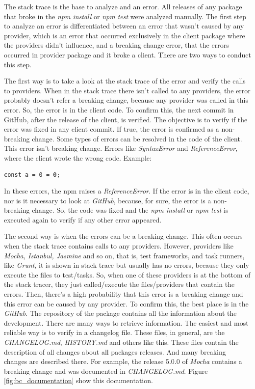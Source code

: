 The stack trace is the base to analyze and an error.
All releases of any package that broke in the \textit{npm install} or \textit{npm test} were analyzed manually. The first step to analyze an error is differentiated between an error that wasn't caused by any provider, which is an error that occurred exclusively in the client package where the providers didn’t influence, and a breaking change error, that the errors occurred in provider package and it broke a client. There are two ways to conduct this step.

The first way is to take a look at the stack trace of the error and verify the calls to providers. When in the stack trace there isn't called to any providers, the error probably doesn’t refer a breaking change, because any provider was called in this error. So, the error is in the client code. To confirm this, the next commit in GitHub, after the release of the client, is verified. The objective is to verify if the error was fixed in any client commit. If true, the error is confirmed as a non-breaking change.
Some types of errors can be resolved in the code of the client. This error isn’t breaking change. Errors like \textit{SyntaxError} and \textit{ReferenceError}, where the client wrote the wrong code. Example:

\begin{lstlisting}[style=Javascript, label=cod:syntax:error, caption={Reference Error code in JavaScript}]
const a = 0 = 0;
\end{lstlisting}

In these errors, the npm raises a \textit{ReferenceError}. If the error is in the client code, nor is it necessary to look at \textit{GitHub}, because, for sure, the error is a non-breaking change. So, the code was fixed and the \textit{npm install} or \textit{npm test} is executed again to verify if any other error appeared.

The second way is when the errors can be a breaking change. This often occurs when the stack trace contains calls to any providers. However, providers like \textit{Mocha, Istanbul, Jasmine} and so on, that is, test frameworks, and task runners, like \textit{Grunt}, it is shown in stack trace but usually has no errors, because they only execute the files to test/tasks. So, when one of these providers is at the bottom of the stack tracer, they just called/execute the files/providers that contain the errors. Then, there’s a high probability that this error is a breaking change and this error can be caused by any provider.
To confirm this, the best place is in the \textit{GitHub}. The repository of the package contains all the information about the development. There are many ways to retrieve information. The easiest and most reliable way is to verify in a changelog file. These files, in general, are the \textit{CHANGELOG.md}, \textit{HISTORY.md} and others like this. These files contain the description of all changes about all packages releases. And many breaking changes are described there. For example, the release 5.0.0 of \textit{Mocha} contains a breaking change and was documented in \textit{CHANGELOG.md}. Figure \ref{fig:bc_documentation} show this documentation.

